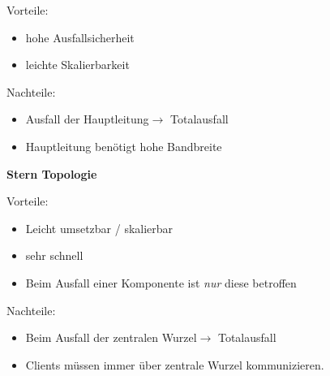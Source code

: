 \documentclass[12pt,a4paper]{article}
\begin{document}
\begin{minipage}[t]{.48\textwidth}
\begin{flushleft}
				\footnotesize Vorteile:
					\begin{itemize}
						\footnotesize
						\item hohe Ausfallsicherheit
						\item leichte Skalierbarkeit
					\end{itemize}
				\footnotesize Nachteile:
					\begin{itemize}
						\footnotesize
						\item Ausfall der Hauptleitung\newline $\longrightarrow$ Totalausfall
						\item Hauptleitung benötigt hohe Bandbreite
					\end{itemize}
				\end{flushleft}
			\end{minipage}
			\begin{minipage}[t]{.48\textwidth}
				\textbf{Stern Topologie}
				\begin{flushright}
				\end{flushright}
				\footnotesize Vorteile:
				\begin{itemize}
					\footnotesize
					\item Leicht umsetzbar / skalierbar
					\item sehr schnell
					\item Beim Ausfall einer Komponente ist \textit{nur} diese betroffen
				\end{itemize}
				\footnotesize Nachteile:
				\begin{itemize}
					\footnotesize
					\item Beim Ausfall der zentralen Wurzel\newline $\longrightarrow$ Totalausfall
					\item Clients müssen immer über zentrale Wurzel kommunizieren.
				\end{itemize}

\end{minipage}
\end{document}
